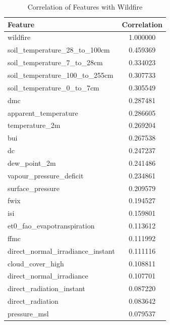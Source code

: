 \begin{table}[H]
	\caption{Correlation of Features with Wildfire}
	\centering
	\label{wildfire_correlation}
	\begin{tabular}{lc}
		\hline
		Feature                                   & Correlation \\ \hline
		wildfire                                  & 1.000000    \\ 
		soil\_temperature\_28\_to\_100cm        & 0.459369    \\ 
		soil\_temperature\_7\_to\_28cm          & 0.334023    \\ 
		soil\_temperature\_100\_to\_255cm       & 0.307733    \\ 
		soil\_temperature\_0\_to\_7cm           & 0.305549    \\ 
		dmc                                        & 0.287481    \\ 
		apparent\_temperature                & 0.286605    \\ 
		temperature\_2m                      & 0.269204    \\ 
		bui                                        & 0.267538    \\ 
		dc                                         & 0.247237    \\ 
		dew\_point\_2m                        & 0.241486    \\ 
		vapour\_pressure\_deficit             & 0.234861    \\ 
		surface\_pressure                    & 0.209579    \\ 
		fwix                                       & 0.194527    \\ 
		isi                                        & 0.159801    \\ 
		et0\_fao\_evapotranspiration          & 0.113612    \\ 
		ffmc                                       & 0.111992    \\ 
		direct\_normal\_irradiance\_instant    & 0.111116    \\ 
		cloud\_cover\_high                    & 0.108811    \\ 
		direct\_normal\_irradiance            & 0.107701    \\ 
		direct\_radiation\_instant            & 0.087220    \\ 
		direct\_radiation                    & 0.083642    \\ 
		pressure\_msl                        & 0.079537    \\ 

\end{tabular}
\end{table}

